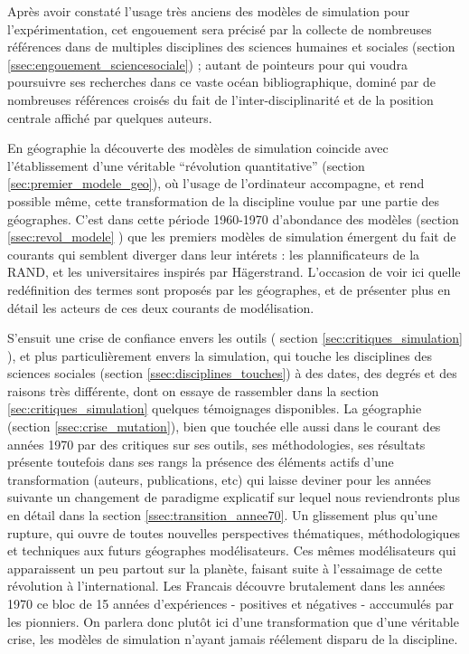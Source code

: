Après avoir constaté l'usage très anciens des modèles de simulation pour l'expérimentation, cet engouement sera précisé par la collecte de nombreuses références dans de multiples disciplines des sciences humaines et sociales (section \ref{ssec:engouement_sciencesociale}) ; autant de pointeurs pour qui voudra poursuivre ses recherches dans ce vaste océan bibliographique, dominé par de nombreuses références croisés du fait de l'inter-disciplinarité et de la position centrale affiché par quelques auteurs.

En géographie la découverte des modèles de simulation coincide avec l'établissement d'une véritable \enquote{révolution quantitative} (section \ref{sec:premier_modele_geo}), où l'usage de l'ordinateur accompagne, et rend possible même, cette transformation de la discipline voulue par une partie des géographes. C'est dans cette période 1960-1970 d'abondance des modèles (section \ref{ssec:revol_modele} ) que les premiers modèles de simulation émergent du fait de courants qui semblent diverger dans leur intérets : les plannificateurs de la RAND, et les universitaires inspirés par Hägerstrand. L'occasion de voir ici quelle redéfinition des termes sont proposés par les géographes, et de présenter plus en détail les acteurs de ces deux courants de modélisation.

S'ensuit une crise de confiance envers les outils ( section \ref{sec:critiques_simulation} ), et plus particulièrement envers la simulation, qui touche les disciplines des sciences sociales (section \ref{ssec:disciplines_touches}) à des dates, des degrés et des raisons très différente, dont on essaye de rassembler dans la section \ref{sec:critiques_simulation} quelques témoignages disponibles. La géographie (section \ref{ssec:crise_mutation}), bien que touchée elle aussi dans le courant des années 1970 par des critiques sur ses outils, ses méthodologies, ses résultats présente toutefois dans ses rangs la présence des éléments actifs d'une transformation (auteurs, publications, etc) qui laisse deviner pour les années suivante un changement de paradigme explicatif sur lequel nous reviendronts plus en détail dans la section \ref{ssec:transition_annee70}. Un glissement plus qu'une rupture, qui ouvre de toutes nouvelles perspectives thématiques, méthodologiques et techniques aux futurs géographes modélisateurs. Ces mêmes modélisateurs qui apparaissent un peu partout sur la planète, faisant suite à l'essaimage de cette révolution à l'international. Les Francais découvre brutalement dans les années 1970 ce bloc de 15 années d'expériences - positives et négatives - acccumulés par les pionniers. On parlera donc plutôt ici d'une transformation que d'une véritable crise, les modèles de simulation n'ayant jamais réélement disparu de la discipline. 

